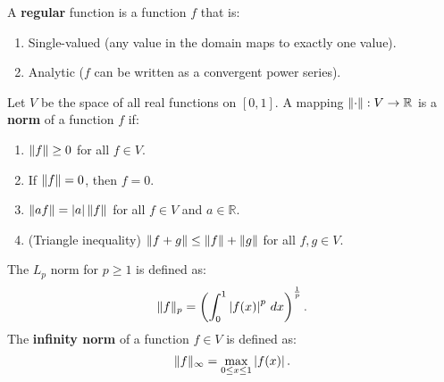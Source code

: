\documentclass{huhtakm-template-book-v2}
\begin{document}
    \begin{defn}
        A \textbf{regular} function is a function $f$ that is:
        \begin{enumerate}
            \item Single-valued (any value in the domain maps to exactly one value).
            \item Analytic ($f$ can be written as a convergent power series).
        \end{enumerate}
    \end{defn}
    \begin{defn}
        Let $V$ be the space of all real functions on $[0,1]$. A mapping $\lVert{\cdot}\rVert:V \to \mathbb{R}$ is a \textbf{norm} of a function $f$ if:
        \begin{enumerate}
            \item $\lVert{f}\rVert \geq 0$ for all $f \in V$.
            \item If $\lVert{f}\rVert = 0$, then $f = 0$.
            \item $\lVert{af}\rVert = \left|{a}\right|\lVert{f}\rVert$ for all $f \in V$ and $a \in \mathbb{R}$.
            \item (Triangle inequality) $\lVert{f+g}\rVert \leq \lVert{f}\rVert+\lVert{g}\rVert$ for all $f,g \in V$.
        \end{enumerate}
        The $L_{p}$ norm for $p \geq 1$ is defined as:
        \begin{equation*}
            \lVert{f}\rVert_{p} = \left(\int_{0}^{1}\left|{f(x)}\right|^{p}\,dx\right)^{\frac{1}{p}}.
        \end{equation*}
        The \textbf{infinity norm} of a function $f \in V$ is defined as:
        \begin{equation*}
            \lVert{f}\rVert_{\infty} = \max_{0 \leq x \leq 1}\left|{f(x)}\right|.
        \end{equation*}
    \end{defn}
\end{document}

